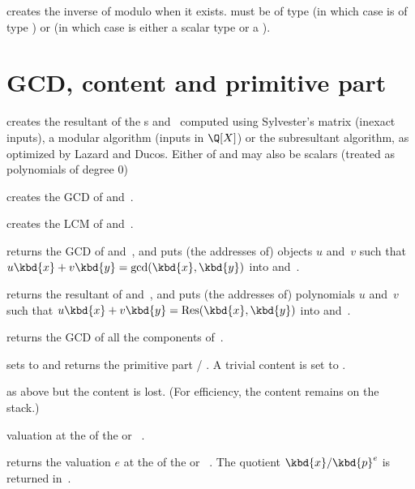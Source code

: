  creates the inverse of  modulo 
when it exists.  must be of type  (in which case  is
of type ) or  (in which case  is either a scalar
type or a ).

\section{GCD, content and primitive part}


 creates the resultant of the s
 and~ computed using Sylvester's matrix (inexact inputs), a
modular algorithm (inputs in $\Q[X]$) or the subresultant algorithm, as
optimized by Lazard and Ducos. Either of  and  may also be
scalars (treated as polynomials of degree $0$)

 creates the GCD of  and~.

 creates the LCM of  and~.

 returns the GCD of 
and~, and puts (the addresses of) objects $u$ and~$v$ such that
$u\kbd{x}+v\kbd{y}=\gcd(\kbd{x},\kbd{y})$ into  and~.

 returns the resultant
of  and~, and puts (the addresses of) polynomials $u$ and~$v$
such that $u\kbd{x}+v\kbd{y}=\text{Res}(\kbd{x},\kbd{y})$ into 
and~.

 returns the GCD of all the components of~.

 sets  to 
and returns the primitive part  / . A trivial content is set to
.

 as above but the content is lost.
(For efficiency, the content remains on the stack.)


 valuation at the  
of the  or ~.

 returns the valuation $e$ at the
  of the  or ~. The quotient
$\kbd{x}/\kbd{p}^{e}$ is returned in~.

